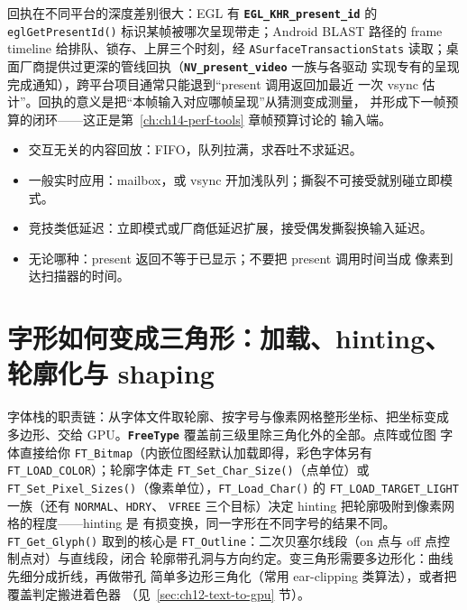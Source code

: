 \documentclass[12pt,a4paper,fontset=fandol]{ctexbook}
\newcommand{\Fn}[1]{\texttt{#1()}}
\newcommand{\Tp}[1]{\texttt{#1}}
\newcommand{\Bk}{\discretionary{}{}{}}
\newcommand{\Lib}[1]{\textbf{\texttt{#1}}}
\begin{document}
回执在不同平台的深度差别很大：EGL 有 \Lib{EGL\_{\Bk}KHR\_{\Bk}present\Bk\_{\Bk}id} 的
\Fn{egl{\Bk}Get{\Bk}Present{\Bk}Id} 标识某帧被哪次呈现带走；Android BLAST 路径的 frame
timeline 给排队、锁存、上屏三个时刻，经 \Tp{ASurface{\Bk}TransactionStats}
读取；桌面厂商提供过更深的管线回执（\Lib{NV\_{\Bk}present\_{\Bk}video} 一族与各驱动
实现专有的呈现完成通知），跨平台项目通常只能退到``present 调用返回加最近
一次 vsync 估计''。回执的意义是把``本帧输入对应哪帧呈现''从猜测变成测量，
并形成下一帧预算的闭环——这正是第~\ref{ch:ch14-perf-tools} 章帧预算讨论的
输入端。

\begin{guideline}[title={呈现策略选择的最小决策表}]
\begin{itemize}
\item 交互无关的内容回放：FIFO，队列拉满，求吞吐不求延迟。
\item 一般实时应用：mailbox，或 vsync 开加浅队列；撕裂不可接受就别碰立即模式。
\item 竞技类低延迟：立即模式或厂商低延迟扩展，接受偶发撕裂换输入延迟。
\item 无论哪种：present 返回不等于已显示；不要把 present 调用时间当成
像素到达扫描器的时间。
\end{itemize}
\end{guideline}

\section{字形如何变成三角形：加载、hinting、轮廓化与 shaping}
\label{sec:ch12-glyph-to-triangle}

字体栈的职责链：从字体文件取轮廓、按字号与像素网格整形坐标、把坐标变成
多边形、交给 GPU。\Lib{FreeType} 覆盖前三级里除三角化外的全部。点阵或位图
字体直接给你 \Tp{FT\_Bitmap}（内嵌位图经默认加载即得，彩色字体另有
\Tp{FT\_LOAD\_COLOR}）；轮廓字体走 \Fn{FT\_Set\_Char\_Size}（点单位）或
\Fn{FT\_Set\_Pixel\Bk\_Sizes}（像素单位），\Fn{FT\_Load\_Char} 的
\Tp{FT\_LOAD\Bk\_TARGET\Bk\_LIGHT} 一族（还有 \Tp{NORMAL}、\Tp{HDRY}、
\Tp{VFREE} 三个目标）决定 hinting 把轮廓吸附到像素网格的程度——hinting 是
有损变换，同一字形在不同字号的结果不同。\Fn{FT\_Get\_Glyph} 取到的核心是
\Tp{FT\_Outline}：二次贝塞尔线段（on 点与 off 点控制点对）与直线段，闭合
轮廓带孔洞与方向约定。变三角形需要多边形化：曲线先细分成折线，再做带孔
简单多边形三角化（常用 ear-clipping 类算法），或者把覆盖判定搬进着色器
（见~\ref{sec:ch12-text-to-gpu} 节）。
\end{document}
